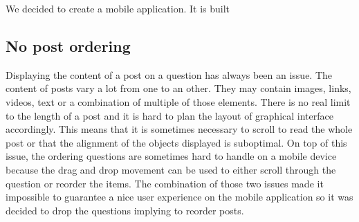 We decided to create a mobile application. It is built


\subsection{No post ordering}
Displaying the content of a post on a question has always been an issue. The content of posts vary a lot from one to an other. They may contain images, links, videos, text or a combination of multiple of those elements. There is no real limit to the length of a post and it is hard to plan the layout of graphical interface accordingly. This means that it is sometimes necessary to scroll to read the whole post or that the alignment of the objects displayed is suboptimal. On top of this issue, the ordering questions are sometimes hard to handle on a mobile device because the drag and drop movement can be used to either scroll through the question or reorder the items. The combination of those two issues made it impossible to guarantee a nice user experience on the mobile application so it was decided to drop the questions implying to reorder posts.
